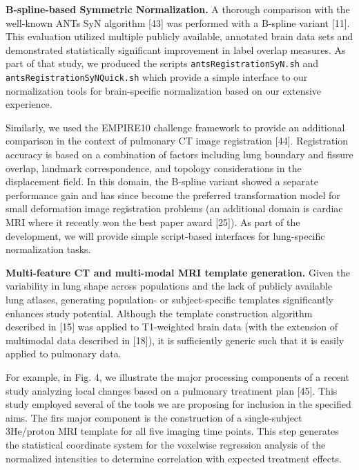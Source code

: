 \documentclass[11pt,]{article}
\begin{document}
\textbf{B-spline-based Symmetric Normalization.} A thorough comparison
with the well-known ANTs SyN algorithm {[}43{]} was performed with a
B-spline variant {[}11{]}. This evaluation utilized multiple publicly
available, annotated brain data sets and demonstrated statistically
significant improvement in label overlap measures. As part of that
study, we produced the scripts \texttt{antsRegistrationSyN.sh} and
\texttt{antsRegistrationSyNQuick.sh} which provide a simple interface to
our normalization tools for brain-specific normalization based on our
extensive experience.

Similarly, we used the EMPIRE10 challenge framework to provide an
additional comparison in the context of pulmonary CT image registration
{[}44{]}. Registration accuracy is based on a combination of factors
including lung boundary and fissure overlap, landmark correspondence,
and topology considerations in the displacement field. In this domain,
the B-spline variant showed a separate performance gain and has since
become the preferred transformation model for small deformation image
registration problems (an additional domain is cardiac MRI where it
recently won the best paper award {[}25{]}). As part of the development,
we will provide simple script-based interfaces for lung-specific
normalization tasks.

\textbf{Multi-feature CT and multi-modal MRI template generation.} Given
the variability in lung shape across populations and the lack of
publicly available lung atlases, generating population- or
subject-specific templates significantly enhances study potential.
Although the template construction algorithm described in {[}15{]} was
applied to T1-weighted brain data (with the extension of multimodal data
described in {[}18{]}), it is sufficiently generic such that it is
easily applied to pulmonary data.

For example, in Fig. 4, we illustrate the major processing components of
a recent study analyzing local changes based on a pulmonary treatment
plan {[}45{]}. This study employed several of the tools we are proposing
for inclusion in the specified aims. The firs major component is the
construction of a single-subject 3He/proton MRI template for all five
imaging time points. This step generates the statistical coordinate
system for the voxelwise regression analysis of the normalized
intensities to determine correlation with expected treatment effects.
\end{document}
